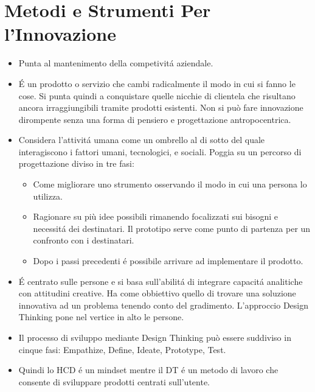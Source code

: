 \chapter{Metodi e Strumenti Per l'Innovazione}

\begin{itemize}
    \item {} Punta al mantenimento della competivit\'a aziendale.
    \item {} \'E un prodotto o servizio che cambi radicalmente il modo in cui si fanno le cose. Si punta quindi a conquistare quelle nicchie di clientela che risultano ancora irraggiungibili tramite prodotti esistenti. Non si pu\`o fare innovazione dirompente senza una forma di pensiero e progettazione antropocentrica.
    \item {} Considera l'attivit\'a umana come un ombrello al di sotto del quale interagiscono i fattori umani, tecnologici, e sociali. Poggia su un percorso di progettazione diviso in tre fasi:
    \begin{itemize}
        \item {} Come migliorare uno strumento osservando il modo in cui una persona lo utilizza.
        \item {} Ragionare su pi\`u idee possibili rimanendo focalizzati sui bisogni e necessit\'a dei destinatari. Il prototipo serve come punto di partenza per un confronto con i destinatari.
        \item {} Dopo i passi precedenti \'e possibile arrivare ad implementare il prodotto.
    \end{itemize} 
    \item {} \'E centrato sulle persone e si basa sull'abilit\'a di integrare capacit\'a analitiche con attitudini creative. Ha come obbiettivo quello di trovare una soluzione innovativa ad un problema tenendo conto del gradimento. L'approccio Design Thinking pone nel vertice in alto le persone.
    \item Il processo di sviluppo mediante Design Thinking pu\`o essere suddiviso in cinque fasi: Empathize, Define, Ideate, Prototype, Test.
    \item Quindi lo HCD \'e un mindset mentre il DT \'e un metodo di lavoro che consente di sviluppare prodotti centrati sull'utente.
\end{itemize}